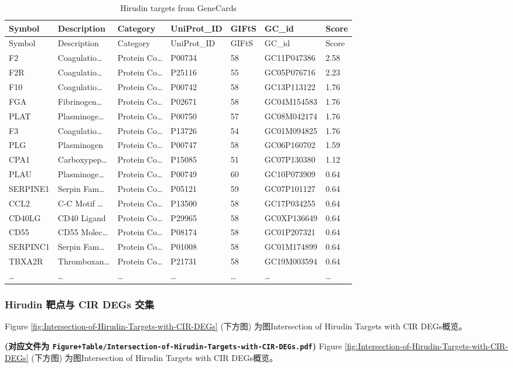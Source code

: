 \documentclass[
]{article}
\begin{document}
\begin{longtable}[]{@{}lllllll@{}}
\caption{\label{tab:Hirudin-targets-from-GeneCards}Hirudin targets from GeneCards}\tabularnewline
\toprule
Symbol & Description & Category & UniProt\_ID & GIFtS & GC\_id & Score\tabularnewline
\midrule
\endfirsthead
\toprule
Symbol & Description & Category & UniProt\_ID & GIFtS & GC\_id & Score\tabularnewline
\midrule
\endhead
F2 & Coagulatio\ldots{} & Protein Co\ldots{} & P00734 & 58 & GC11P047386 & 2.58\tabularnewline
F2R & Coagulatio\ldots{} & Protein Co\ldots{} & P25116 & 55 & GC05P076716 & 2.23\tabularnewline
F10 & Coagulatio\ldots{} & Protein Co\ldots{} & P00742 & 58 & GC13P113122 & 1.76\tabularnewline
FGA & Fibrinogen\ldots{} & Protein Co\ldots{} & P02671 & 58 & GC04M154583 & 1.76\tabularnewline
PLAT & Plasminoge\ldots{} & Protein Co\ldots{} & P00750 & 57 & GC08M042174 & 1.76\tabularnewline
F3 & Coagulatio\ldots{} & Protein Co\ldots{} & P13726 & 54 & GC01M094825 & 1.76\tabularnewline
PLG & Plasminogen & Protein Co\ldots{} & P00747 & 58 & GC06P160702 & 1.59\tabularnewline
CPA1 & Carboxypep\ldots{} & Protein Co\ldots{} & P15085 & 51 & GC07P130380 & 1.12\tabularnewline
PLAU & Plasminoge\ldots{} & Protein Co\ldots{} & P00749 & 60 & GC10P073909 & 0.64\tabularnewline
SERPINE1 & Serpin Fam\ldots{} & Protein Co\ldots{} & P05121 & 59 & GC07P101127 & 0.64\tabularnewline
CCL2 & C-C Motif \ldots{} & Protein Co\ldots{} & P13500 & 58 & GC17P034255 & 0.64\tabularnewline
CD40LG & CD40 Ligand & Protein Co\ldots{} & P29965 & 58 & GC0XP136649 & 0.64\tabularnewline
CD55 & CD55 Molec\ldots{} & Protein Co\ldots{} & P08174 & 58 & GC01P207321 & 0.64\tabularnewline
SERPINC1 & Serpin Fam\ldots{} & Protein Co\ldots{} & P01008 & 58 & GC01M174899 & 0.64\tabularnewline
TBXA2R & Thromboxan\ldots{} & Protein Co\ldots{} & P21731 & 58 & GC19M003594 & 0.64\tabularnewline
\ldots{} & \ldots{} & \ldots{} & \ldots{} & \ldots{} & \ldots{} & \ldots{}\tabularnewline
\bottomrule
\end{longtable}

\hypertarget{hirudin-ux9776ux70b9ux4e0e-cir-degs-ux4ea4ux96c6}{%
\subsubsection{Hirudin 靶点与 CIR DEGs 交集}\label{hirudin-ux9776ux70b9ux4e0e-cir-degs-ux4ea4ux96c6}}

Figure \ref{fig:Intersection-of-Hirudin-Targets-with-CIR-DEGs} (下方图) 为图Intersection of Hirudin Targets with CIR DEGs概览。

\textbf{(对应文件为 \texttt{Figure+Table/Intersection-of-Hirudin-Targets-with-CIR-DEGs.pdf})}
Figure \ref{fig:Intersection-of-Hirudin-Targets-with-CIR-DEGs} (下方图) 为图Intersection of Hirudin Targets with CIR DEGs概览。
\end{document}
